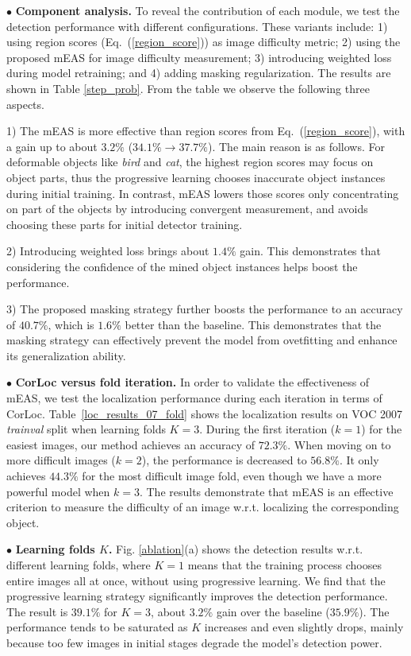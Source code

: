 \documentclass[10pt,twocolumn,letterpaper]{article}
\begin{document}
\noindent $\bullet$ \textbf{Component analysis.} To reveal the contribution of each module, we test the detection performance with different configurations. These variants include: 1) using region scores (Eq.~(\ref{region_score})) as image difficulty metric; 2) using the proposed mEAS for image difficulty measurement; 3) introducing weighted loss during model retraining; and 4) adding masking regularization. The results are shown in Table \ref{step_prob}. From the table we observe the following three aspects.

1) The mEAS is more effective than region scores from
Eq.~(\ref{region_score}), with a gain up to about $3.2\%$ ($34.1\% \rightarrow 37.7\%$). The main reason is as follows. For deformable objects like \emph{bird} and \emph{cat}, the highest region scores may focus on object parts, thus the progressive learning chooses inaccurate object instances during initial training. In contrast, mEAS lowers those scores only concentrating on part of the objects by introducing convergent measurement, and avoids choosing these parts for initial detector training.

2) Introducing weighted loss brings about $1.4\%$ gain. This demonstrates that considering the confidence of the mined object instances helps boost the performance.

3) The proposed masking strategy further boosts the performance to an accuracy of $40.7\%$, which is $1.6\%$ better than the baseline. This demonstrates that the masking strategy can effectively prevent the model from ovetfitting and enhance its generalization ability.

\noindent $\bullet$ \textbf{CorLoc versus fold iteration.} In order to validate the effectiveness of mEAS, we test the localization performance during each iteration in terms of CorLoc. Table~\ref{loc_results_07_fold} shows the localization results on VOC 2007 \emph{trainval} split when learning folds $K\!=\!3$. During the first iteration ($k=1$) for the easiest images, our method achieves an accuracy of $72.3\%$. When moving on to more difficult images ($k=2$), the performance is decreased to $56.8\%$.  It only achieves $44.3\%$ for the most difficult image fold, even though we have a more powerful model when $k=3$. The results demonstrate that mEAS is an effective criterion to measure the difficulty of an image w.r.t. localizing the corresponding object.


\noindent $\bullet$ \textbf{Learning folds $K$.} Fig. \ref{ablation}(a) shows the detection results w.r.t. different learning folds, where $K\!=\!1$ means that the training process chooses entire images all at once, without using progressive learning. We find that the progressive learning strategy significantly improves the detection performance. The result is $39.1\%$ for $K\!=\!3$, \ie about $3.2\%$ gain over the baseline ($35.9\%$). The performance tends to be saturated as $K$ increases and even slightly drops, mainly because too few images in initial stages degrade the model's detection power.
\end{document}
